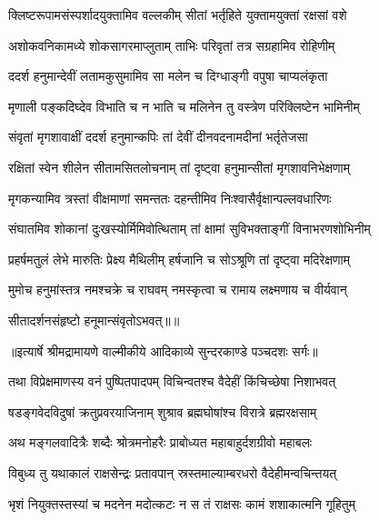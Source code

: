 \twolineshloka
{क्लिष्टरूपामसंस्पर्शादयुक्तामिव वल्लकीम्}
{सीतां भर्तृहिते युक्तामयुक्तां रक्षसां वशे} %

\twolineshloka
{अशोकवनिकामध्ये शोकसागरमाप्लुताम्}
{ताभिः परिवृतां तत्र सग्रहामिव रोहिणीम्} %

\twolineshloka
{ददर्श हनुमान्देवीं लतामकुसुमामिव}
{सा मलेन च दिग्धाङ्गी वपुषा चाप्यलंकृता} %

\twolineshloka
{मृणाली पङ्कदिघ्देव विभाति च न भाति च}
{मलिनेन तु वस्त्रेण परिक्लिष्टेन भामिनीम्} %

\twolineshloka
{संवृतां मृगशावाक्षीं ददर्श हनुमान्कपिः}
{तां देवीं दीनवदनामदीनां भर्तृतेजसा} %

\twolineshloka
{रक्षितां स्वेन शीलेन सीतामसितलोचनाम्}
{तां दृष्ट्वा हनुमान्सीतां मृगशावनिभेक्षणाम्} %

\twolineshloka
{मृगकन्यामिव त्रस्तां वीक्षमाणां समन्ततः}
{दहन्तीमिव निःश्वासैर्वृक्षान्पल्लवधारिणः} %

\twolineshloka
{संघातमिव शोकानां दुःखस्योर्मिमिवोत्थिताम्}
{तां क्षामां सुविभक्ताङ्गीं विनाभरणशोभिनीम्} %

\twolineshloka
{प्रहर्षमतुलं लेभे मारुतिः प्रेक्ष्य मैथिलीम्}
{हर्षजानि च सोऽश्रूणि तां दृष्ट्वा मदिरेक्षणाम्} %

\twolineshloka
{मुमोच हनुमांस्तत्र नमश्चक्रे च राघवम्}
{नमस्कृत्वा च रामाय लक्ष्मणाय च वीर्यवान्} %

{सीतादर्शनसंहृष्टो हनूमान्संवृतोऽभवत्॥॥} %

\addtocounter{shlokacount}{1}


{॥इत्यार्षे श्रीमद्रामायणे वाल्मीकीये आदिकाव्ये सुन्दरकाण्डे पञ्चदशः सर्गः॥}


\twolineshloka
{तथा विप्रेक्षमाणस्य वनं पुष्पितपादपम्}
{विचिन्वतश्च वैदेहीं किंचिच्छेषा निशाभवत्} %

\twolineshloka
{षडङ्गवेदविदुषां क्रतुप्रवरयाजिनाम्}
{शुश्राव ब्रह्मघोषांश्च विरात्रे ब्रह्मरक्षसाम्} %

\twolineshloka
{अथ मङ्गलवादित्रैः शब्दैः श्रोत्रमनोहरैः}
{प्राबोध्यत महाबाहुर्दशग्रीवो महाबलः} %

\twolineshloka
{विबुध्य तु यथाकालं राक्षसेन्द्रः प्रतावपान्}
{स्रस्तमाल्याम्बरधरो वैदेहीमन्वचिन्तयत्} %

\twolineshloka
{भृशं नियुक्तस्तस्यां च मदनेन मदोत्कटः}
{न स तं राक्षसः कामं शशाकात्मनि गूहितुम्} %

